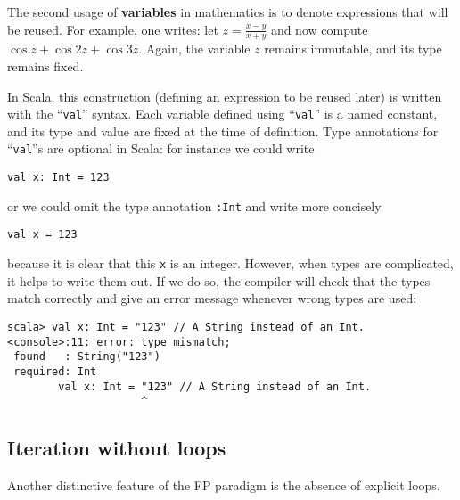 The second usage of \textbf{variables} in mathematics
is to denote expressions that will be reused. For example, one writes:
let $z=\frac{x-y}{x+y}$ and now compute $\cos z+\cos2z+\cos3z$.
Again, the variable $z$ remains immutable, and its type remains fixed.

In Scala, this construction (defining an expression to be reused later)
is written with the ``\lstinline!val!''
syntax. Each variable defined using ``\lstinline!val!''
is a named constant, and its type and value are fixed at the time
of definition. Type annotations for ``\lstinline!val!''s
are optional in Scala: for instance we could write 
\begin{lstlisting}
val x: Int = 123
\end{lstlisting}
or we could omit the type annotation \lstinline!:Int!
and write more concisely
\begin{lstlisting}
val x = 123
\end{lstlisting}
because it is clear that this \texttt{}\lstinline!x!
is an integer. However, when types are complicated, it helps to write
them out. If we do so, the compiler will check that the types match
correctly and give an error message whenever wrong types are used:
\begin{lstlisting}
scala> val x: Int = "123" // A String instead of an Int.
<console>:11: error: type mismatch;
 found   : String("123")
 required: Int
        val x: Int = "123" // A String instead of an Int.                     
                     ^ 
\end{lstlisting}

\subsection{Iteration without loops}

Another distinctive feature of the FP paradigm is the absence of explicit
loops.

